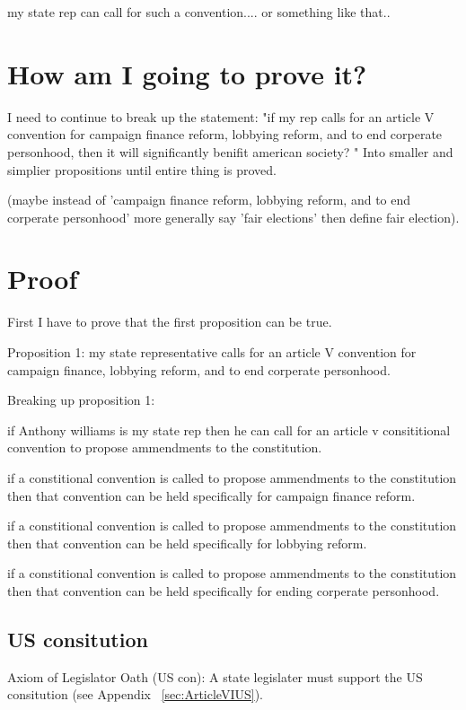 \documentclass[11pt]{article} %
\begin{document}
\begin{enumerate}
my state rep can call for such a convention.... or something like that.. 

\section{How am I going to prove it?}

I need to continue to break up the statement: "if my rep calls for an article V convention for campaign finance reform, lobbying reform, and to end corperate personhood,  then it will significantly benifit american society? " Into smaller and simplier propositions until entire thing is proved.

(maybe instead of 'campaign finance reform, lobbying reform, and to end corperate personhood' more generally say 'fair elections' then define fair election). 

\section{Proof}

First I have to prove that the first proposition can be true.

Proposition 1: my state representative calls for an article V convention for campaign finance, lobbying reform, and to end corperate personhood.

Breaking up proposition 1:

if Anthony williams is my state rep then he can call for an article v consititional convention to propose ammendments to the constitution.

if a constitional convention is called to propose ammendments to the constitution then that convention can be held specifically for campaign finance reform.

if a constitional convention is called to propose ammendments to the constitution then that convention can be held specifically for lobbying reform.

if a constitional convention is called to propose ammendments to the constitution then that convention can be held specifically for ending corperate personhood.

\subsection{US consitution}

Axiom of  Legislator Oath (US con):  A state legislater must support the US consitution (see Appendix ~\ref{sec:ArticleVIUS}).


\end{enumerate}
\end{document}
